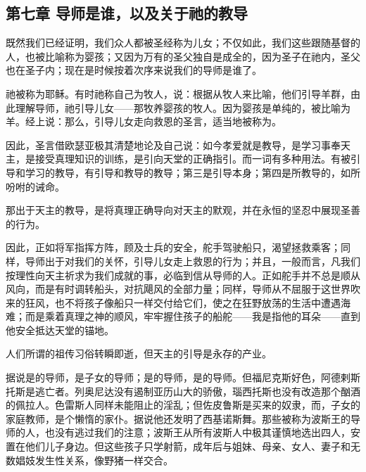 
\subsection{第七章 导师是谁，以及关于祂的教导}

既然我们已经证明，我们众人都被圣经称为儿女；不仅如此，我们这些跟随基督的人，也被比喻称为婴孩；又因为万有的圣父独自是成全的，因为圣子在祂内，圣父也在圣子内；现在是时候按着次序来说我们的导师是谁了。\par

祂被称为耶稣。有时祂称自己为牧人，说：根据从牧人来比喻，他们引导羊群，由此理解导师，祂引导儿女——那牧养婴孩的牧人。因为婴孩是单纯的，被比喻为羊。经上说：那么，引导儿女走向救恩的圣言，适当地被称为。\par

因此，圣言借欧瑟亚极其清楚地论及自己说：如今孝爱就是教导，是学习事奉天主，是接受真理知识的训练，是引向天堂的正确指引。而一词有多种用法。有被引导和学习的教导，有引导和教导的教导；第三是引导本身；第四是所教导的，如所吩咐的诫命。\par

那出于天主的教导，是将真理正确导向对天主的默观，并在永恒的坚忍中展现圣善的行为。\par

因此，正如将军指挥方阵，顾及士兵的安全，舵手驾驶船只，渴望拯救乘客；同样，导师出于对我们的关怀，引导儿女走上救恩的行为；并且，一般而言，凡我们按理性向天主祈求为我们成就的事，必临到信从导师的人。正如舵手并不总是顺从风向，而是有时调转船头，对抗飓风的全部力量；同样，导师从不屈服于这世界吹来的狂风，也不将孩子像船只一样交付给它们，使之在狂野放荡的生活中遭遇海难；而是乘着真理之神的顺风，牢牢握住孩子的船舵——我是指他的耳朵——直到他安全抵达天堂的锚地。\par

人们所谓的祖传习俗转瞬即逝，但天主的引导是永存的产业。\par

据说是的导师，是子女的导师；是的导师，是的导师。但福尼克斯好色，阿德剌斯托斯是逃亡者。列奥尼达没有遏制亚历山大的骄傲，瑙西托斯也没有改造那个酗酒的佩拉人。色雷斯人同样未能阻止的淫乱；但佐皮鲁斯是买来的奴隶，而，子女的家庭教师，是个懒惰的家仆。据说他还发明了西基诺斯舞。那些被称为波斯王的导师的人，也没有逃过我们的注意；波斯王从所有波斯人中极其谨慎地选出四人，安置在他们儿子身边。但这些孩子只学射箭，成年后与姐妹、母亲、女人、妻子和无数娼妓发生性关系，像野猪一样交合。\par

